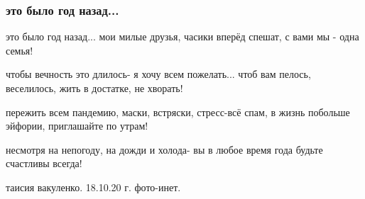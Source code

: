  
 
 

\subsubsection{это было год назад...}
\label{sec:poetry.rus.taisia_vakulenko.semja}

это было год назад...
мои милые друзья,
часики вперёд спешат,
с вами мы - одна семья!

чтобы вечность это длилось-
я хочу всем пожелать...
чтоб вам пелось, веселилось,
жить в достатке, не хворать!

пережить всем пандемию,
маски, встряски, стресс-всё спам,
в жизнь побольше эйфории,
приглашайте  по утрам!

несмотря на непогоду,
на дожди и холода-
вы в любое время года
будьте счастливы всегда!

таисия вакуленко.
18.10.20 г.
фото-инет.
